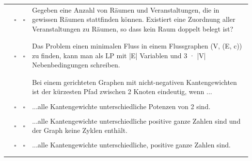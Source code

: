 \documentclass{article}
\begin{document}
\begin{longtable}[H]
\begin{tabular}{ | p{1cm} | c c | p{13cm} |}
     \cite{probeklausur21}\cite{probeklausur24} & $\square$ &  $\square$  &  Gegeben eine Anzahl von Räumen und Veranstaltungen, die in gewissen Räumen stattfinden können. Existiert eine Zuordnung aller Veranstaltungen zu Räumen, so dass kein Raum doppelt belegt ist? \\ & & & \\\hline \hline & & & \\  
     \cite{probeklausur21}\cite{probeklausur24} & $\square$ &  $\square$  &  Das Problem einen minimalen Fluss in einem Flussgraphen (V, (E, c)) zu finden, kann man als LP mit |E| Variablen und 3 · |V| Nebenbedingungen schreiben. \\ & & & \\\hline \hline & & & \\
     & & & Bei einem gerichteten Graphen mit nicht-negativen Kantengewichten ist der kürzesten Pfad zwischen 2 Knoten eindeutig, wenn ... \\ & & & \\
     \cite{probeklausur24}\cite{hauptklausur21} & $\square$ &  $\square$  &  ...alle Kantengewichte unterschiedliche Potenzen von 2 sind. \\ & & & \\
     \cite{probeklausur24}& $\square$ &  $\square$  & ...alle Kantengewichte unterschiedliche positive ganze Zahlen sind
und der Graph keine Zyklen enthält. \\ & & & \\
    \cite{hauptklausur21}& $\square$ &  $\square$  & ...alle Kantengewichte unterschiedliche, positive ganze Zahlen sind. \\ & & & \\ \hline \hline & & & \\ 
    
    \end{tabular}
    \label{tab:mutiple_choice}
\end{longtable}
\end{document}
